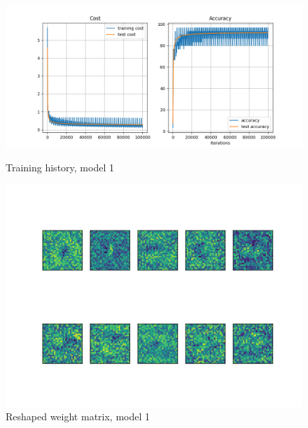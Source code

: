 \documentclass[a4paper,10pt]{article}
\begin{document}
\begin{figure}[h]
\begin{minipage}{0.5\textwidth}
  \centering
  \includegraphics[width=\linewidth]{figures/training_1layer.png}
  \caption{Training history, model 1}
  \label{fig:img1}
\end{minipage}
\begin{minipage}{0.5\textwidth}
  \centering
  \includegraphics[width=\linewidth]{figures/Figure_1.png}
  \caption{Reshaped weight matrix, model 1}
  \label{fig:img2}
\end{minipage}
\end{figure}
\end{document}
